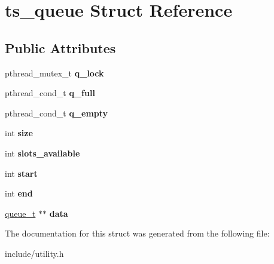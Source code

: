 \hypertarget{structts__queue}{\section{ts\-\_\-queue \-Struct \-Reference}
\label{d8/dc0/structts__queue}
}
\subsection*{\-Public \-Attributes}
\begin{DoxyCompactItemize}
\item 
\hypertarget{structts__queue_ad0cae9c852542a4654c5d723ba906538}{pthread\-\_\-mutex\-\_\-t {\bfseries q\-\_\-lock}}\label{d8/dc0/structts__queue_ad0cae9c852542a4654c5d723ba906538}

\item 
\hypertarget{structts__queue_a9b4bd3067a357146ba9088e6b435c8f7}{pthread\-\_\-cond\-\_\-t {\bfseries q\-\_\-full}}\label{d8/dc0/structts__queue_a9b4bd3067a357146ba9088e6b435c8f7}

\item 
\hypertarget{structts__queue_a49aff9cc7b2cffb3e9ea76e8a6ee0872}{pthread\-\_\-cond\-\_\-t {\bfseries q\-\_\-empty}}\label{d8/dc0/structts__queue_a49aff9cc7b2cffb3e9ea76e8a6ee0872}

\item 
\hypertarget{structts__queue_ab89bcdfc115f126854e2e4600d50b5d2}{int {\bfseries size}}\label{d8/dc0/structts__queue_ab89bcdfc115f126854e2e4600d50b5d2}

\item 
\hypertarget{structts__queue_a6d83dc742d44ab788272bdd459ae9e19}{int {\bfseries slots\-\_\-available}}\label{d8/dc0/structts__queue_a6d83dc742d44ab788272bdd459ae9e19}

\item 
\hypertarget{structts__queue_a6857d41af0c2acc1c08b6e11767708ff}{int {\bfseries start}}\label{d8/dc0/structts__queue_a6857d41af0c2acc1c08b6e11767708ff}

\item 
\hypertarget{structts__queue_a617541f01622f3d640230b141d8f1805}{int {\bfseries end}}\label{d8/dc0/structts__queue_a617541f01622f3d640230b141d8f1805}

\item 
\hypertarget{structts__queue_af81f6be362e410a8687c142a0671928f}{\hyperlink{structqueue__t}{queue\-\_\-t} $\ast$$\ast$ {\bfseries data}}\label{d8/dc0/structts__queue_af81f6be362e410a8687c142a0671928f}

\end{DoxyCompactItemize}


\-The documentation for this struct was generated from the following file\-:\begin{DoxyCompactItemize}
\item 
include/utility.\-h\end{DoxyCompactItemize}
